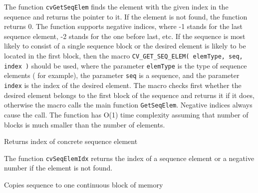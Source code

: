 \begin{description}
\end{description}


The function \texttt{cvGetSeqElem} finds the element with the given
index in the sequence and returns the pointer to it. If the element
is not found, the function returns 0. The function supports negative
indices, where -1 stands for the last sequence element, -2 stands for
the one before last, etc. If the sequence is most likely to consist of
a single sequence block or the desired element is likely to be located
in the first block, then the macro
\texttt{CV\_GET\_SEQ\_ELEM( elemType, seq, index )}
should be used, where the parameter \texttt{elemType} is the
type of sequence elements (  for example), the parameter
\texttt{seq} is a sequence, and the parameter \texttt{index} is the index
of the desired element. The macro checks first whether the desired element
belongs to the first block of the sequence and returns it if it does,
otherwise the macro calls the main function \texttt{GetSeqElem}. Negative
indices always cause the  call. The function has O(1)
time complexity assuming that number of blocks is much smaller than the
number of elements.

\label{SeqElemIdx}

Returns index of concrete sequence element


\begin{description}
\end{description}

The function \texttt{cvSeqElemIdx} returns the index of a sequence element or a negative number if the element is not found.

\label{CvtSeqToArray}

Copies sequence to one continuous block of memory

